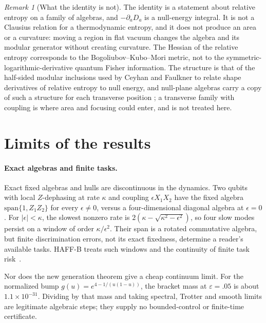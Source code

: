 \documentclass[12pt]{article}
\theoremstyle{definition}
\theoremstyle{remark}
\newtheorem{remark}[theorem]{Remark}
\begin{document}
\begin{remark}[What the identity is not]
The identity is a statement about relative entropy on a family of algebras, and
\(-\partial_aD_a\) is a null-energy integral. It is not a Clausius relation for a
thermodynamic entropy, and it does not produce an area or a curvature: moving a
region in flat vacuum changes the algebra and its modular generator without creating
curvature. The Hessian of the relative entropy corresponds to the Bogoliubov--Kubo--Mori
metric, not to the symmetric-logarithmic-derivative quantum Fisher information. The
structure is that of the half-sided modular inclusions used by Ceyhan and Faulkner
\cite{CF} to relate shape derivatives of relative entropy to null energy, and null-plane
algebras carry a copy of such a structure for each transverse position \cite{CTT}; a
transverse family with coupling is where area and focusing could enter, and is not
treated here.
\end{remark}

\section{Limits of the results}\label{sec:limits}

\paragraph{Exact algebras and finite tasks.} Exact fixed algebras and hulls
are discontinuous in the dynamics. Two qubits with local \(Z\)-dephasing at
rate \(\kappa\) and coupling \(\epsilon X_1X_2\) have the fixed algebra
\(\mathrm{span}\{1,Z_1Z_2\}\) for every \(\epsilon\ne0\), versus a
four-dimensional diagonal algebra at \(\epsilon=0\).
For \(|\epsilon|<\kappa\), the slowest nonzero rate is
\(2(\kappa-\sqrt{\kappa^2-\epsilon^2})\), so four slow modes persist on a
window of order \(\kappa/\epsilon^2\). Their span is a rotated commutative
algebra, but finite discrimination errors, not its exact fixedness, determine
a reader's available tasks. HAFF-B treats such windows and the continuity of
finite task risk~\cite{PaperB}.

Nor does the new generation theorem give a cheap continuum limit.
For the normalized bump \(g(u)=e^{4-1/(u(1-u))}\), the bracket mass at
\(\varepsilon=.05\) is about \(1.1\times10^{-31}\). Dividing by that mass and
taking spectral, Trotter and smooth limits are legitimate algebraic steps;
they supply no bounded-control or finite-time certificate.
\end{document}
